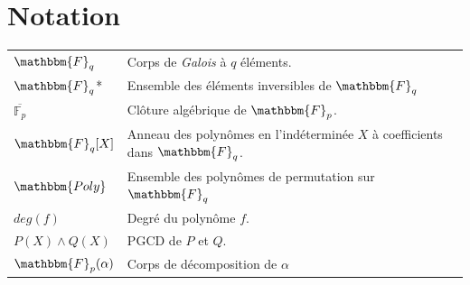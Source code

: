 \documentclass[12pt]{article}
\theoremstyle{definition}
\begin{document}

\tableofcontents
\pagebreak
\section*{\Huge Notation}

\vspace{3cm}
\begin{tabular}{p{4cm}p{15cm}}
$\mathbbm{F}_q$ & Corps de \textit{Galois} à $q$ éléments.\\
$\mathbbm{F}_q$* & Ensemble des éléments inversibles de $\mathbbm{F}_q$\\
$\overline{\mathbb{F}_p}$ & Clôture algébrique de $\mathbbm{F}_p$.\\
$\mathbbm{F}_q[X]$ & Anneau des polynômes en l'indéterminée $X$ à coefficients dans $\mathbbm{F}_q$.\\
$\mathbbm{Poly}$ & Ensemble des polynômes de permutation sur $\mathbbm{F}_q$\\
$deg(f)$ & Degré du polynôme $f$.\\
$P(X) \wedge Q(X)$ & PGCD de $P$ et $Q$.\\
$\mathbbm{F}_p(\alpha)$ & Corps de décomposition de  $\alpha$\\
\end{tabular}

\pagebreak

\end{document}
